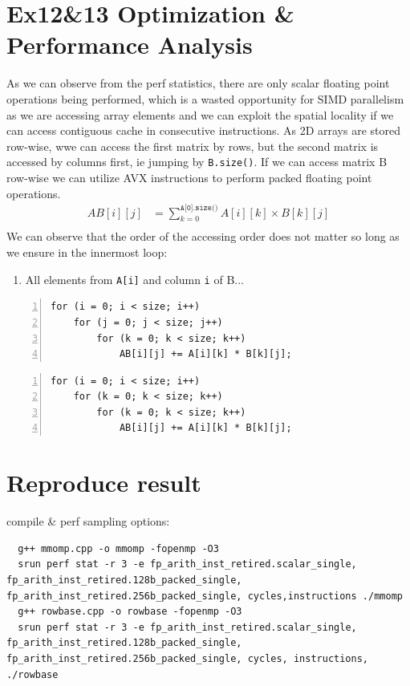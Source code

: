 \documentclass[a4paper]{article}
\begin{document}
\section*{Ex12\&13 Optimization \& Performance Analysis}
As we can observe from the perf statistics, there are only scalar floating point operations being performed, 
which is a wasted opportunity for SIMD parallelism as we are accessing array elements and we can exploit the spatial locality 
if we can access contiguous cache in consecutive instructions. As 2D arrays are stored row-wise, wwe can access the first matrix by rows, 
but the second matrix is accessed by columns first, ie jumping by \texttt{B.size()}. If we can access matrix B row-wise we can utilize AVX
instructions to perform packed floating point operations. 
\begin{align*}
    AB[i][j] &= \sum_{k=0}^{\texttt{A[0].size()}} A[i][k] \times B[k][j]\\
\end{align*}
We can observe that the order of the accessing order does not matter so long as we ensure in the innermost loop:
\begin{enumerate}
    \item All elements from \texttt{A[i]} and column \texttt{i} of B... 
\end{enumerate}
\par\vspace{3ex}
\begin{minipage}{0.5\linewidth}
\begin{Verbatim}[frame=topline,numbers=left,label= Original,framesep=3mm]
for (i = 0; i < size; i++)
    for (j = 0; j < size; j++)
        for (k = 0; k < size; k++)
            AB[i][j] += A[i][k] * B[k][j];
\end{Verbatim}
\end{minipage}\hfill
\begin{minipage}{0.4\linewidth}
\begin{Verbatim}[frame=topline,numbers=left,label= Optimized,framesep=3mm]
for (i = 0; i < size; i++)
    for (k = 0; k < size; k++)
        for (k = 0; k < size; k++)
            AB[i][j] += A[i][k] * B[k][j];
\end{Verbatim}
\end{minipage}\hfill



\section*{Reproduce result}

compile \& perf sampling options:
\begin{lstlisting}
  g++ mmomp.cpp -o mmomp -fopenmp -O3
  srun perf stat -r 3 -e fp_arith_inst_retired.scalar_single, fp_arith_inst_retired.128b_packed_single, fp_arith_inst_retired.256b_packed_single, cycles,instructions ./mmomp
  g++ rowbase.cpp -o rowbase -fopenmp -O3
  srun perf stat -r 3 -e fp_arith_inst_retired.scalar_single, fp_arith_inst_retired.128b_packed_single, fp_arith_inst_retired.256b_packed_single, cycles, instructions, ./rowbase
\end{lstlisting}
\end{document}

